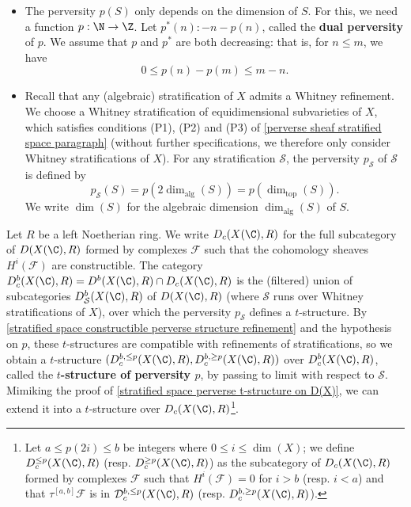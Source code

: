\begin{itemize}
    \item The perversity $p(S)$ only depends on the dimension of $S$. For this, we need a function $p:\N\to\Z$. Let $p^*(n):-n-p(n)$, called the \textbf{dual perversity} of $p$. We assume that $p$ and $p^*$ are both decreasing: that is, for $n\leq m$, we have
    \[0\leq p(n)-p(m)\leq m-n.\]
    \item Recall that any (algebraic) stratification of $X$ admits a Whitney refinement. We choose a Whitney stratification of equidimensional subvarieties of $X$, which satisfies conditions (P1), (P2) and (P3) of \ref{perverse sheaf stratified space paragraph} (without further specifications, we therefore only consider Whitney stratifications of $X$). For any stratification $\mathcal{S}$, the perversity $p_\mathcal{S}$ of $\mathcal{S}$ is defined by
    \[p_\mathcal{S}(S)=p(2\dim_{\mathrm{alg}}(S))=p(\dim_{\mathrm{top}}(S)).\]
    We write $\dim(S)$ for the algebraic dimension $\dim_{\mathrm{alg}}(S)$ of $S$.
\end{itemize}

Let $R$ be a left Noetherian ring. We write $D_c(X(\C),R)$ for the full subcategory of $D(X(\C),R)$ formed by complexes $\mathscr{F}$ such that the cohomology sheaves $H^i(\mathscr{F})$ are constructible. The category $D^b_c(X(\C),R)=D^b(X(\C),R)\cap D_c(X(\C),R)$ is the (filtered) union of subcategories $D^b_\mathcal{S}(X(\C),R)$ of $D(X(\C),R)$ (where $\mathcal{S}$ runs over Whitney stratifications of $X$), over which the perversity $p_\mathcal{S}$ defines a $t$-structure. By \cref{stratified space constructible perverse structure refinement} and the hypothesis on $p$, these $t$-structures are compatible with refinements of stratifications, so we obtain a $t$-structure $(D^{b,\leq p}_c(X(\C),R),D^{b,\geq p}_c(X(\C),R))$ over $D^b_c(X(\C),R)$, called the \textbf{$t$-structure of perversity $p$}, by passing to limit with respect to $\mathcal{S}$. Mimiking the proof of \cref{stratified space perverse t-structure on D(X)}, we can extend it into a $t$-structure over $D_c(X(\C),R)$\footnote{Let $a\leq p(2i)\leq b$ be integers where $0\leq i\leq\dim(X)$; we define $D_c^{\leq p}(X(\C),R)$ (resp. $D_c^{\geq p}(X(\C),R)$) as the subcategory of $D_c(X(\C),R)$ formed by complexes $\mathscr{F}$ such that $H^i(\mathscr{F})=0$ for $i>b$ (resp. $i<a$) and that $\tau^{[a,b]}\mathscr{F}$ is in $\mathcal{D}_c^{b,\leq p}(X(\C),R)$ (resp. $D_c^{b,\geq p}(X(\C),R)$).}.

